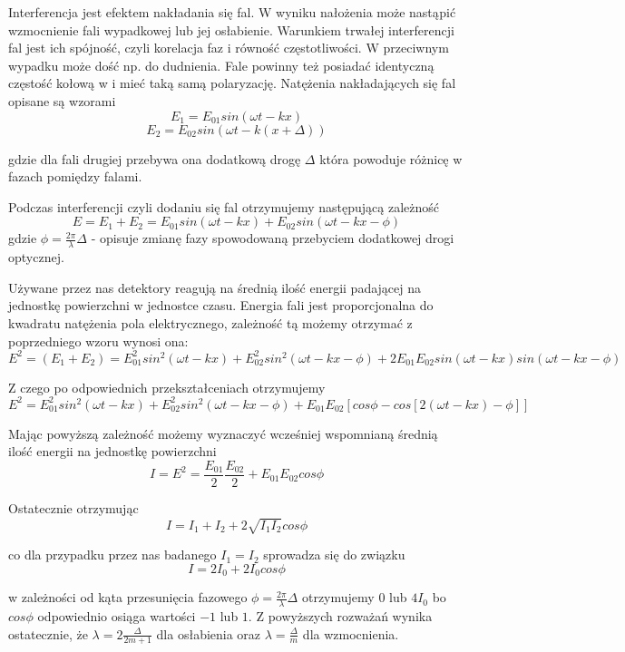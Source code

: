 \documentclass[a4paper]{article}
\newlength{\du}
\begin{document}
Interferencja jest efektem nakładania się fal. W wyniku nałożenia może nastąpić wzmocnienie fali wypadkowej lub jej osłabienie.  Warunkiem trwałej interferencji fal jest ich spójność, czyli korelacja faz i równość częstotliwości. W przeciwnym wypadku może dość np. do dudnienia. %
Fale powinny też posiadać identyczną częstość kołową w i mieć taką samą polaryzację.
Natężenia nakładających się fal opisane są wzorami
$$E_{1} = E_{01} sin( \omega t − kx )$$
$$E_{2} = E_{02} sin( \omega t − k ( x + \Delta ))$$

gdzie dla fali drugiej przebywa ona dodatkową drogę $\Delta$ która powoduje różnicę w fazach pomiędzy falami.

Podczas interferencji czyli dodaniu się fal otrzymujemy następującą zależność
$$E = E_{1} + E_{2} = E_{01} sin( \omega t − kx ) + E_{02} sin( \omega t − k x  − \phi )$$ gdzie $\phi =\frac{2\pi}{\lambda}\Delta$ - opisuje zmianę fazy spowodowaną przebyciem dodatkowej drogi optycznej.

Używane przez nas detektory reagują na średnią ilość energii padającej na jednostkę powierzchni w jednostce czasu. Energia fali jest proporcjonalna do kwadratu natężenia pola elektrycznego, zależność tą możemy otrzymać z poprzedniego wzoru wynosi ona:
$$E^2 = ( E_{1} + E_{2} ) = E_{01}^2 sin^2 ( \omega t − kx ) + E_{02}^2 sin^2 ( \omega t − kx − \phi ) + 2 E_{01} E_{02} sin( \omega t − kx ) sin( \omega t − kx − \phi )$$

Z czego po odpowiednich przekształceniach otrzymujemy 
$$E^2 = E_{01}^2 sin^2 (\omega t − kx ) + E_{02}^2 sin^2 ( \omega t − kx − \phi ) + E_{01} E_{02} [cos \phi − cos[ 2 ( \omega t − kx ) − \phi ]]$$

Mając powyższą zależność możemy wyznaczyć wcześniej wspomnianą średnią ilość energii na jednostkę powierzchni
$$I = E^2 =\frac{E_{01}}{2} \frac{E_{02}}{2} + E_{01}E_{02} cos \phi$$

Ostatecznie otrzymując 
$$I = I_{1} + I_{2} + 2 \sqrt{I_{1} I_{2}} cos \phi$$

co dla przypadku przez nas badanego $I_{1} = I_{2}$ sprowadza się do związku
$$I = 2I_{0} + 2 I_{0} cos \phi$$

w zależności od kąta przesunięcia fazowego $\phi =\frac{2\pi}{\lambda}\Delta$ otrzymujemy $0$ lub $4 I_{0}$ bo $cos \phi$ odpowiednio osiąga wartości $-1$ lub $1$. Z powyższych rozważań wynika ostatecznie, że
$\lambda = 2 \frac{\Delta}{2m+1} $ dla osłabienia oraz $\lambda = \frac{\Delta}{m}$ dla wzmocnienia.
\end{document}
